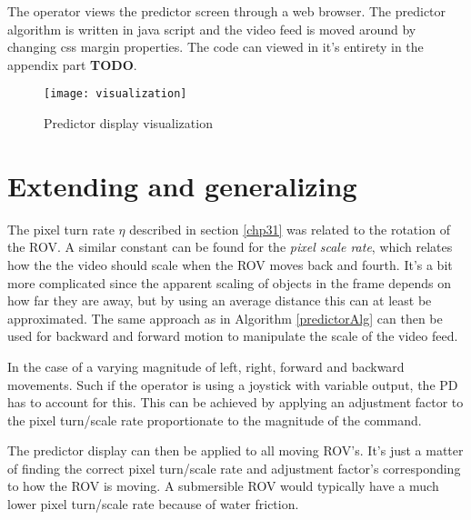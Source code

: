 The operator views the predictor screen through a web browser. The predictor algorithm is written in java script and the video feed is moved around by changing css margin properties. The code can viewed in it's entirety in the appendix part \textbf{TODO}.

\begin{figure}[h!]
    \centering
    \texttt{[image: visualization]}
    \caption{Predictor display visualization}
    \label{predictorvis}
\end{figure}

\section{Extending and generalizing}\label{expand}

The pixel turn rate $\eta$ described in section \ref{chp31} was related to the rotation of the ROV. A similar constant can be found for the \emph{pixel scale rate}, which relates how the the video should scale when the ROV moves back and fourth. It's a bit more complicated since the apparent scaling of objects in the frame depends on how far they are away, but by using an average distance this can at least be approximated. The same approach as in Algorithm \ref{predictorAlg} can then be used for backward and forward motion to manipulate the scale of the video feed.

In the case of a varying magnitude of left, right, forward and backward movements. Such if the operator is using a joystick with variable output, the PD has to account for this. This can be achieved by applying an adjustment factor to the pixel turn/scale rate proportionate to the magnitude of the command.

The predictor display can then be applied to all moving ROV's. It's just a matter of finding the correct pixel turn/scale rate and adjustment factor's corresponding to how the ROV is moving. A submersible ROV would typically have a much lower pixel turn/scale rate because of water friction.
